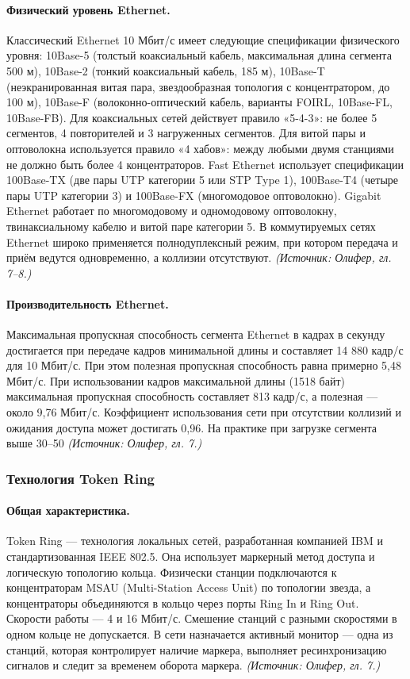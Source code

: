 \documentclass[a4paper,12pt]{article}
\begin{document}
\paragraph{Физический уровень Ethernet.}
Классический Ethernet 10 Мбит/с имеет следующие спецификации физического уровня: 10Base-5 (толстый коаксиальный кабель, максимальная длина сегмента 500 м), 10Base-2 (тонкий коаксиальный кабель, 185 м), 10Base-T (неэкранированная витая пара, звездообразная топология с концентратором, до 100 м), 10Base-F (волоконно-оптический кабель, варианты FOIRL, 10Base-FL, 10Base-FB). Для коаксиальных сетей действует правило «5-4-3»: не более 5 сегментов, 4 повторителей и 3 нагруженных сегментов. Для витой пары и оптоволокна используется правило «4 хабов»: между любыми двумя станциями не должно быть более 4 концентраторов. Fast Ethernet использует спецификации 100Base-TX (две пары UTP категории 5 или STP Type 1), 100Base-T4 (четыре пары UTP категории 3) и 100Base-FX (многомодовое оптоволокно). Gigabit Ethernet работает по многомодовому и одномодовому оптоволокну, твинаксиальному кабелю и витой паре категории 5. В коммутируемых сетях Ethernet широко применяется полнодуплексный режим, при котором передача и приём ведутся одновременно, а коллизии отсутствуют.
\textit{(Источник: Олифер, гл. 7–8.)}

\paragraph{Производительность Ethernet.}
Максимальная пропускная способность сегмента Ethernet в кадрах в секунду достигается при передаче кадров минимальной длины и составляет 14 880 кадр/с для 10 Мбит/с. При этом полезная пропускная способность равна примерно 5,48 Мбит/с. При использовании кадров максимальной длины (1518 байт) максимальная пропускная способность составляет 813 кадр/с, а полезная — около 9,76 Мбит/с. Коэффициент использования сети при отсутствии коллизий и ожидания доступа может достигать 0,96. На практике при загрузке сегмента выше 30–50 %
\textit{(Источник: Олифер, гл. 7.)}

\subsubsection{Технология Token Ring}

\paragraph{Общая характеристика.}
Token Ring — технология локальных сетей, разработанная компанией IBM и стандартизованная IEEE 802.5. Она использует маркерный метод доступа и логическую топологию кольца. Физически станции подключаются к концентраторам MSAU (Multi-Station Access Unit) по топологии звезда, а концентраторы объединяются в кольцо через порты Ring In и Ring Out. Скорости работы — 4 и 16 Мбит/с. Смешение станций с разными скоростями в одном кольце не допускается. В сети назначается активный монитор — одна из станций, которая контролирует наличие маркера, выполняет ресинхронизацию сигналов и следит за временем оборота маркера.
\textit{(Источник: Олифер, гл. 7.)}
\end{document}
